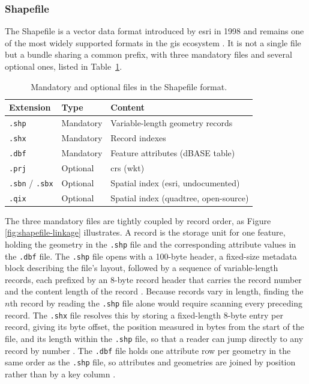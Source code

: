\subsubsection{Shapefile}
\label{background:spatial-data-formats-and-storage-models:file-formats:shapefile}
The Shapefile is a vector data format introduced by \acrfull{esri} in 1998 and remains one of the most widely supported formats in the \acrfull{gis} ecosystem \parencite{esri1998_shapefile_technical_description}. It is not a single file but a bundle sharing a common prefix, with three mandatory files and several optional ones, listed in Table~\ref{tab:shapefile-components}.

\begin{table}[H]
    \centering
    \begin{tabular}{lll}
        \toprule
        \textbf{Extension} & \textbf{Type} & \textbf{Content} \\
        \midrule
        \texttt{.shp} & Mandatory & Variable-length geometry records \\
        \texttt{.shx} & Mandatory & Record indexes \\
        \texttt{.dbf} & Mandatory & Feature attributes (dBASE table) \\
        \texttt{.prj} & Optional & \acrlong{crs} (\acrshort{wkt}) \\
        \texttt{.sbn} / \texttt{.sbx} & Optional & Spatial index (\acrshort{esri}, undocumented) \\
        \texttt{.qix} & Optional & Spatial index (quadtree, open-source) \\
        \bottomrule
    \end{tabular}
    \caption[Shapefile component files.]{Mandatory and optional files in the Shapefile format.}
    \label{tab:shapefile-components}
\end{table}

The three mandatory files are tightly coupled by record order, as Figure \ref{fig:shapefile-linkage} illustrates. A record is the storage unit for one feature, holding the geometry in the \texttt{.shp} file and the corresponding attribute values in the \texttt{.dbf} file. The \texttt{.shp} file opens with a 100-byte header, a fixed-size metadata block describing the file's layout, followed by a sequence of variable-length records, each prefixed by an 8-byte record header that carries the record number and the content length of the record \parencite{esri1998_shapefile_technical_description}. Because records vary in length, finding the \(n\)th record by reading the \texttt{.shp} file alone would require scanning every preceding record. The \texttt{.shx} file resolves this by storing a fixed-length 8-byte entry per record, giving its byte offset, the position measured in bytes from the start of the file, and its length within the \texttt{.shp} file, so that a reader can jump directly to any record by number \parencite{esri1998_shapefile_technical_description}. The \texttt{.dbf} file holds one attribute row per geometry in the same order as the \texttt{.shp} file, so attributes and geometries are joined by position rather than by a key column \parencite{esri1998_shapefile_technical_description}.

